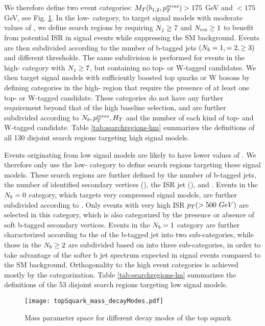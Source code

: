 We therefore define two event categories: $M_{T}(b_{1,2},p_{T}^{miss})>175$ GeV and $< 175$ GeV, see Fig. \ref{StopParameterSpace}. In the low-\mtb{} category, to target signal models with moderate values of \dm, we define search regions by requiring $N_{j}\geq7$ and $N_{\text{res}}\geq1$ to benefit from potential ISR in signal events while suppressing the SM background. Events are then subdivided according to the number of b-tagged jets $(N_{b}=1,=2,\geq3)$ and different \met{} thresholds. The same subdivision is performed for events in the high-\mtb{} category with $N_{j}\geq7$, but containing no top- or W-tagged candidates. We then target signal models with sufficiently boosted top quarks or W bosons by defining categories in the high-\mtb{} region that require the presence of at least one top- or W-tagged candidate. These categories do not have any further \nj{} requirement beyond that of the high \dm{} baseline selection, and are further subdivided according to $N_{b}, p_{T}^{miss}, H_{T}$ and the number of each kind of top- and W-tagged candidate. Table \ref{tab:searchregions-hm} summarizes the definitions of all 130 disjoint search regions targeting high \dm{} signal models.

Events originating from low \dm{} signal models are likely to have lower values of \mtb. We therefore only use the low-\mtb{} category to define search regions targeting these signal models. These search regions are further defined by the number of b-tagged jets, the number of identified secondary vertices (\nsv), the ISR jet \pt{} (\ptb), and \met. Events in the $N_{b}=0$ category, which targets very compressed signal models, are further subdivided according to \nj. Only events with very high ISR $p_{T}(>500~GeV)$ are selected in this category, which is also categorized by the presence or absence of soft b-tagged secondary vertices. Events in the $N_{b}=1$ category are further characterized according to the \pt{} of the b-tagged jet into two sub-categories, while those in the $N_{b}\geq2$ are subdivided based on \ptbonetwo{} into three sub-categories, in order to take advantage of the softer b jet \pt{} spectrum expected in signal events compared to the SM background. Orthogonality to the high \dm{} event categories is achieved mostly by the \mtb{} categorization. Table \ref{tab:searchregions-lm}  summarizes the definitions of the 53 disjoint search regions targeting low \dm{} signal models.

\begin{figure}
 	\centering
	\texttt{[image: topSquark\_mass\_decayModes.pdf]}
 	\caption[Top Squark Decay Modes]{Mass parameter space for different decay modes of the top squark.}
 	\label{StopParameterSpace} 
\end{figure}


